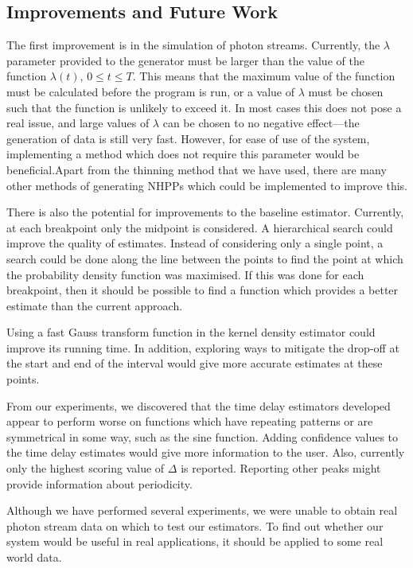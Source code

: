 \documentclass[a4paper,11pt,twoside]{article}
\begin{document}
\subsection{Improvements and Future Work}
\label{sec-9-1}

   The first improvement is in the simulation of photon streams. Currently, the
   $\lambda$ parameter provided to the generator must be larger than the value
   of the function $\lambda(t),\,0\leq t\leq T$. This means that the maximum
   value of the function must be calculated before the program is run, or a
   value of $\lambda$ must be chosen such that the function is unlikely to
   exceed it. In most cases this does not pose a real issue, and large values of
   $\lambda$ can be chosen to no negative effect---the generation of data is
   still very fast. However, for ease of use of the system, implementing a
   method which does not require this parameter would be beneficial.Apart from
   the thinning method that we have used, there are many other methods of
   generating NHPPs \cite{pasupathy2011,lewis1976simulation} which could be
   implemented to improve this.

   There is also the potential for improvements to the baseline
   estimator. Currently, at each breakpoint only the midpoint is considered. A
   hierarchical search could improve the quality of estimates. Instead of
   considering only a single point, a search could be done along the line
   between the points to find the point at which the probability density
   function was maximised. If this was done for each breakpoint, then it should
   be possible to find a function which provides a better estimate than the
   current approach.

   Using a fast Gauss transform function in the kernel density estimator could
   improve its running time. In addition, exploring ways to mitigate the
   drop-off at the start and end of the interval would give more accurate
   estimates at these points.

   From our experiments, we discovered that the time delay estimators developed
   appear to perform worse on functions which have repeating patterns or are
   symmetrical in some way, such as the sine function. Adding confidence values
   to the time delay estimates would give more information to the user. Also,
   currently only the highest scoring value of $\Delta$ is reported. Reporting
   other peaks might provide information about periodicity.

   Although we have performed several experiments, we were unable to obtain real
   photon stream data on which to test our estimators. To find out whether our
   system would be useful in real applications, it should be applied to some
   real world data.
\end{document}
